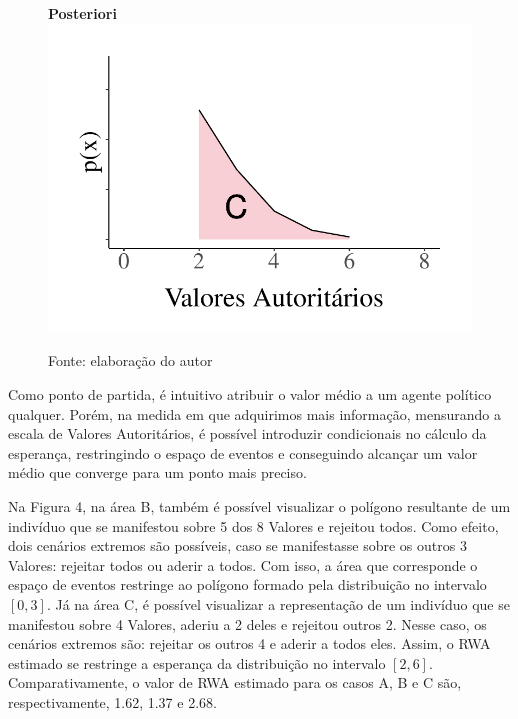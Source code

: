 \documentclass[
12pt,				%
openright,			%
twoside,			%
a4paper,			%
english,			%
french,				%
spanish,			%
brazil				%
]{abntex2}
\begin{document}
\begin{figure}[!htb]
\begin{minipage}[b]{0.4\textwidth}
	\end{minipage}
	\hspace{.05\linewidth}
\begin{minipage}[b]{0.4\textwidth}
	\textbf{Posteriori}
	\label{fig:rwa_area_max}
	\centering
	\includegraphics[width=1\linewidth]{figures/area_parcial_max_rwa}
	
\end{minipage}

Fonte: elaboração do autor
\end{figure}

Como ponto de partida, é intuitivo atribuir o valor médio a um agente político qualquer. Porém, na medida em que adquirimos mais informação, mensurando a escala de Valores Autoritários, é possível introduzir condicionais no cálculo da esperança, restringindo o espaço de eventos e conseguindo alcançar um valor médio que converge para um ponto mais preciso. 

Na Figura 4, na área B, também é possível visualizar o polígono resultante de um indivíduo que se manifestou sobre 5 dos 8 Valores e rejeitou todos. Como efeito, dois cenários extremos são possíveis, caso se manifestasse sobre os outros 3 Valores: rejeitar todos ou aderir a todos. Com isso, a área que corresponde o espaço de eventos restringe ao polígono formado pela distribuição no intervalo $[0, 3]$. Já na área C, é possível visualizar a representação de um indivíduo que se manifestou sobre 4 Valores, aderiu a 2 deles e rejeitou outros 2. Nesse caso, os cenários extremos são: rejeitar os outros 4 e aderir a todos eles. Assim, o RWA estimado se restringe a esperança da distribuição no intervalo $[2, 6]$. Comparativamente, o valor de RWA estimado para os casos A, B e C são, respectivamente, 1.62, 1.37 e 2.68.
\end{document}
